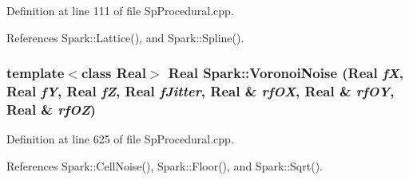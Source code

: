 Definition at line 111 of file Sp\-Procedural.cpp.

References Spark::Lattice(), and Spark::Spline().
\subsubsection{\setlength{\rightskip}{0pt plus 5cm}template$<$class Real$>$ Real Spark::Voronoi\-Noise (Real {\em f\-X}, Real {\em f\-Y}, Real {\em f\-Z}, Real {\em f\-Jitter}, Real \& {\em rf\-OX}, Real \& {\em rf\-OY}, Real \& {\em rf\-OZ})}\label{namespaceSpark_a84}


Definition at line 625 of file Sp\-Procedural.cpp.

References Spark::Cell\-Noise(), Spark::Floor(), and Spark::Sqrt().